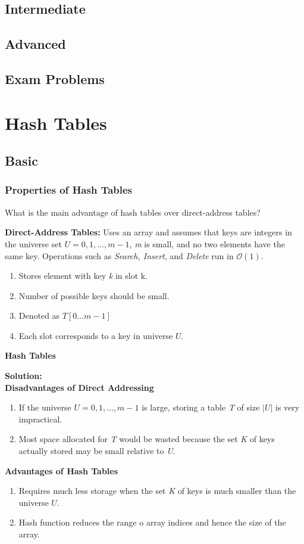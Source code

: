 \documentclass[11pt,fleqn]{book}
\begin{document}
\section{Intermediate}
\section{Advanced}
\section{Exam Problems}
\chapter{Hash Tables}
\section{Basic}
\vspace{1em}
\subsection{Properties of Hash Tables}
\begin{example}
What is the main advantage of hash tables over direct-address tables?
\end{example}
\begin{definition}
\textbf{Direct-Address Tables:}
Uses an array and assumes that keys are integers in the universe set $U = {0,1,\dots,m-1}$, 
\textit{m} is small, and no two elements have the same key. Operations such as \textit{Search, Insert}, and \textit{Delete} run in $\mathcal{O}(1)$. 
\begin{enumerate}
    \item Stores element with key \textit{k} in slot k. 
    \item Number of possible keys should be small. 
    \item Denoted as $T[0\dots m - 1]$
    \item Each slot corresponds to a key in universe $U$.
\end{enumerate}
\end{definition}
\begin{definition}
\textbf{Hash Tables}
\end{definition}
\textbf{Solution:}\\
\textbf{Disadvantages of Direct Addressing}
\begin{enumerate}
    \item If the universe $U = {0,1,\dots,m-1}$ is large, storing a table \textit{T} of size $|U|$ is very impractical. 
    \item Most space allocated for \textit{T} would be wasted because the set \textit{K} of keys actually stored may be small relative to \textit{U}.
\end{enumerate}
\textbf{Advantages of Hash Tables}
\begin{enumerate}
    \item Requires much less storage when the set \textit{K} of keys is much smaller than the universe $U$.
    \item Hash function reduces the range o array indices and hence the size of the array. 
\end{enumerate}
\end{document}
